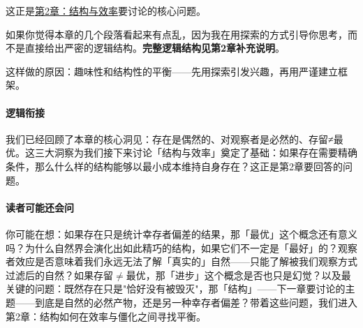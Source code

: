 \documentclass[../main.tex]{subfiles}
\begin{document}
	这正是\hyperref[ch:structure]{第2章：结构与效率}要讨论的核心问题。

	\begin{tcolorbox}[colback=blue!5, title=\textit{读者可能的问题}]
		如果你觉得本章的几个段落看起来有点乱，因为我在用探索的方式引导你思考，而不是直接给出严密的逻辑结构。\textbf{完整逻辑结构见第2章补充说明}。

		这样做的原因：趣味性和结构性的平衡——先用探索引发兴趣，再用严谨建立框架。
	\end{tcolorbox}

	\paragraph*{逻辑衔接}
	我们已经回顾了本章的核心洞见：存在是偶然的、对观察者是必然的、存留≠最优。这三大洞察为我们接下来讨论「结构与效率」奠定了基础：如果存在需要精确条件，那么什么样的结构能够以最小成本维持自身存在？这正是第2章要回答的问题。

	\paragraph*{读者可能还会问}
	你可能在想：如果存在只是统计幸存者偏差的结果，那「最优」这个概念还有意义吗？为什么自然界会演化出如此精巧的结构，如果它们不一定是「最好」的？观察者效应是否意味着我们永远无法了解「真实的」自然——只能了解被我们观察方式过滤后的自然？如果存留$\neq$最优，那「进步」这个概念是否也只是幻觉？以及最关键的问题：既然存在只是"恰好没有被毁灭"，那「结构」——下一章要讨论的主题——到底是自然的必然产物，还是另一种幸存者偏差？带着这些问题，我们进入第2章：结构如何在效率与僵化之间寻找平衡。
\end{document}
